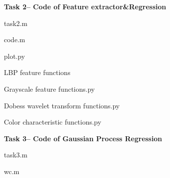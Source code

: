 \documentclass{apmcmthesis}
\begin{document}
\noindent\textbf{Task 2-- Code of Feature extractor\&Regression}

task2.m

code.m

plot.py

LBP feature functions

Grayscale feature functions.py

Dobess wavelet transform functions.py

Color characteristic functions.py


\noindent\textbf{Task 3-- Code of Gaussian Process Regression}

task3.m

%
wc.m

\end{document}
